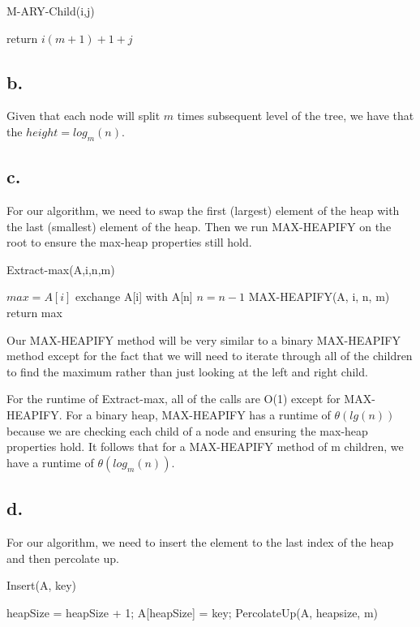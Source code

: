 \documentclass[12pt]{article}
\begin{document}
 \begin{algorithm}
\caption{M-ARY-Child(i,j)}
\begin{algorithmic} 
\STATE return  $i(m+1) + 1 + j$
\end{algorithmic}
\end{algorithm}

\subsection{b.}

Given that each node will split $m$ times subsequent level of the tree, we have that the $height = log_m(n)$.

\subsection{c.}

For our algorithm, we need to swap the first (largest) element of the heap with the last (smallest) element of the heap. Then we run MAX-HEAPIFY on the root to ensure the max-heap properties still hold.

\begin{algorithm}
\caption{Extract-max(A,i,n,m)}
\begin{algorithmic}
\STATE $max = A[i]$
\STATE exchange A[i] with A[n]
\STATE $n = n - 1$
\STATE MAX-HEAPIFY(A, i, n, m) 
\STATE return max
\end{algorithmic}
\end{algorithm}

Our MAX-HEAPIFY method will be very similar to a binary MAX-HEAPIFY method except for the fact that we will need to iterate through all of the children to find the maximum rather than just looking at the left and right child. 

For the runtime of Extract-max, all of the calls are O(1) except for MAX-HEAPIFY. For a binary heap, MAX-HEAPIFY has a runtime of $\theta(lg(n))$ because we are checking each child of a node and ensuring the max-heap properties hold. It follows that for a MAX-HEAPIFY method of m children, we have a runtime of  $\theta(log_m(n))$.

\subsection{d.}

For our algorithm, we need to insert the element to the last index of the heap and then percolate up.

\begin{algorithm}
\caption{Insert(A, key)}
\begin{algorithmic}
\STATE heapSize = heapSize + 1;
\STATE A[heapSize] = key;
\STATE PercolateUp(A, heapsize, m)
\end{algorithmic}
\end{algorithm}
\end{document}
